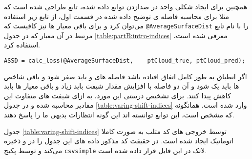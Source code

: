 همچنین برای ایجاد شکلی واحد در صدازدن توابع داده شده، تابع 
طراحی شده است که مثلا برای محاسبه فاصله ی  توضیح داده شده در قسمت اول، از تابع زیر استفاده می‌توان کرد و  برای باقی معیار ها نیز کافیست که \verb|@AverageSurfaceDist| را با نام تابع مرتبط در آن معیار که در جدول \ref{table:partB:intro-indices} معرفی شده است، استفاده کرد.


\begin{latin}
\begin{lstlisting}[frame=none]
ASSD = calc_loss(@AverageSurfaceDist,    ptCloud_true, ptCloud_pred);
\end{lstlisting}
\end{latin}


اگر انطباق به طور کامل اتفاق افتاده باشد فاصله های  و  باید صفر شود و باقی شاخص ها باید یک شود و آن دو فاصله با افزایش مقدار شیفت باید زیاد و باقی معیار ها باید کاهش پیدا کنند. برای تشخیص درستی این مورد، به ازای شیفت های متفاوت این مقادیر محاسبه شده و در جدول \ref{table:varing-shift-indices}
وارد شده است. همانگونه که مشخص است، این توابع توانسته اند این گونه انتظارات بدیهی ما را پاسخ دهند.


\begin{table}[b!]
	\centering
	\begin{LTR}
	\end{LTR}
	\caption{}
	\label{table:varing-shift-indices}
\end{table}



\begin{note}
	جدول \ref{table:varing-shift-indices} توسط خروجی های کد متلب  به صورت کاملا اتوماتیک ایجاد شده است. در حقیقت کد مذکور داده های این جدول را در  و  ذخیره می‌کند و توسط پکیج \texttt{csvsimple} لاتک در این فایل  قرار داده شده است.
\end{note}

